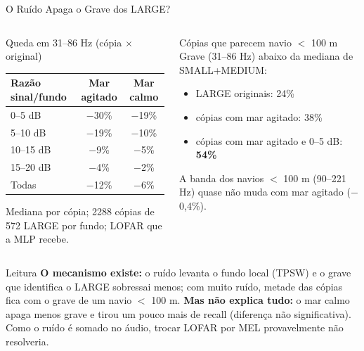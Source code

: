 \documentclass[aspectratio=169]{beamer}
\newcommand{\calo}[1]{\cellcolor{red!20}#1}
\begin{document}
\begin{frame}{O Ruído Apaga o Grave dos LARGE?}
    \footnotesize
    \begin{columns}[t]
        \begin{block}{\small Queda em 31--86 Hz (cópia $\times$ original)}
            \scriptsize
            \centering
            \setlength{\tabcolsep}{4pt}
            \begin{tabular}{lcc}
            \toprule
            Razão sinal/fundo & Mar agitado & Mar calmo \\
            \midrule
            0--5 dB & \calo{$-$30\%} & $-$19\% \\
            5--10 dB & $-$19\% & $-$10\% \\
            10--15 dB & $-$9\% & $-$5\% \\
            15--20 dB & $-$4\% & $-$2\% \\
            \midrule
            Todas & $-$12\% & $-$6\% \\
            \bottomrule
            \end{tabular}

            \vspace{0.1cm}
            {\tiny Mediana por cópia; 2288 cópias de 572 LARGE por fundo; LOFAR que a MLP recebe.\par}
        \end{block}
        \begin{block}{\small Cópias que parecem navio $<$ 100 m}
            \scriptsize
            Grave (31--86 Hz) abaixo da mediana de SMALL+MEDIUM:
            \begin{itemize}
                \setlength{\itemsep}{1pt}
                \item LARGE originais: 24\%
                \item cópias com mar agitado: 38\%
                \item cópias com mar agitado e 0--5 dB: \textbf{54\%}
            \end{itemize}
            A banda dos navios $<$ 100 m (90--221 Hz) quase não muda com mar agitado ($-$0,4\%).
        \end{block}
    \end{columns}
    \begin{alertblock}{Leitura}
        \scriptsize
        \textbf{O mecanismo existe:} o ruído levanta o fundo local (TPSW) e o grave que identifica o LARGE sobressai menos; com muito ruído, metade das cópias fica com o grave de um navio $<$ 100 m. \textbf{Mas não explica tudo:} o mar calmo apaga menos grave e tirou um pouco mais de recall (diferença não significativa). Como o ruído é somado no áudio, trocar LOFAR por MEL provavelmente não resolveria.
    \end{alertblock}
\end{frame}
\end{document}
